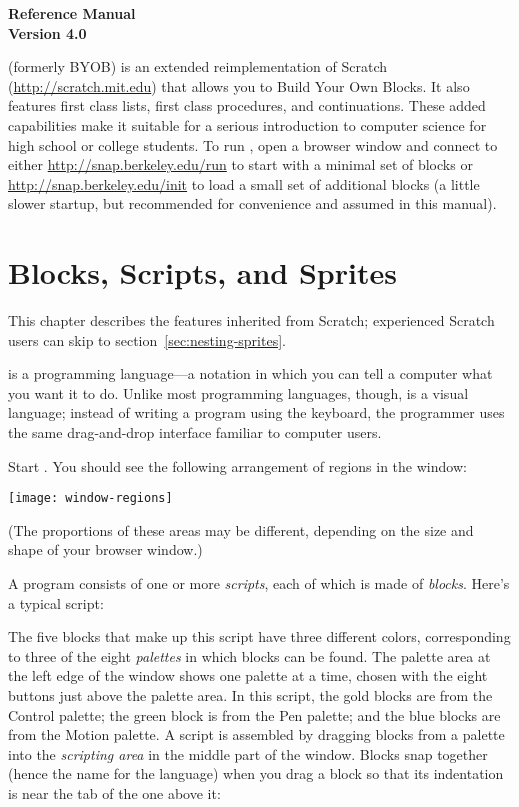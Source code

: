 \documentclass{report}
\begin{document}
\clearpage

\begin{center}
\bf \Huge \Snap{} Reference Manual \\
\huge Version 4.0
\vspace{40pt}
\end{center}

\Snap{} (formerly BYOB) is an extended reimplementation of Scratch (\url{http://scratch.mit.edu}) that allows you to Build Your Own Blocks. It also features first class lists, first class procedures, and continuations. These added capabilities make it suitable for a serious introduction to computer science for high school or college students.  To run \Snap{}, open a browser window and connect to either \url{http://snap.berkeley.edu/run} to start with a minimal set of blocks or \url{http://snap.berkeley.edu/init} to load a small set of additional blocks (a little slower startup, but recommended for convenience and assumed in this manual).

\clearpage

\chapter{Blocks, Scripts, and Sprites}

This chapter describes the \Snap{} features inherited from Scratch; experienced Scratch users can skip to section~\ref{sec:nesting-sprites}.

\Snap{} is a programming language---a notation in which you can tell a computer what you want it to do. Unlike most programming languages, though, \Snap{} is a visual language; instead of writing a program using the keyboard, the \Snap{} programmer uses the same drag-and-drop interface familiar to computer users.

Start \Snap{}. You should see the following arrangement of regions in the window:

\begin{center}
\texttt{[image: window-regions]}
\end{center}

(The proportions of these areas may be different, depending on the size and shape of your browser window.)

A \Snap{} program consists of one or more \emph{scripts}, each of which is made of \emph{blocks}. Here's a typical script:

\label{fig:typical-script}

The five blocks that make up this script have three different colors, corresponding to three of the eight \emph{palettes} in which blocks can be found. The palette area at the left edge of the window shows one palette at a time, chosen with the eight buttons just above the palette area. In this script, the gold blocks are from the Control palette; the green block is from the Pen palette; and the blue blocks are from the Motion palette. A script is assembled by dragging blocks from a palette into the \emph{scripting area} in the middle part of the window. Blocks snap together (hence the name \Snap{} for the language) when you drag a block so that its indentation is near the tab of the one above it:
\end{document}
